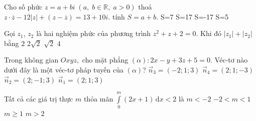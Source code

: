 \begin{ex}%
	Cho số phức $z=a+bi\; (a,\; b\in\mathbb{R},\; a>0)$ thoả $z\cdot \overline{z}-12|z|+(z-\overline{z})=13+10i$. tính $S=a+b$.
	\choice
	{S=7}
	{\True S=17}
	{S=-17}
	{S=5}
\end{ex}

\begin{ex}%
Gọi $z_1$, $z_2$ là hai nghiệm phức của phương trình $z^2+z+2=0$. Khi đó $\left| z_1\right|+\left| z_2\right|$ bằng
\choice
{$2$}
{\True $2\sqrt{2}$}
{$\sqrt{2}$}
{$4$}
\end{ex}

\begin{ex}%
Trong không gian $Oxyz,$ cho mặt phẳng $(\alpha)\colon 2x-y+3z+5=0$. Véc-tơ nào dưới đây là một véc-tơ pháp tuyến của $(\alpha)$?
\choice
{$\vec{n}_3=(-2;1;3)$}
{$\vec{n}_4=(2;1;-3)$}
{\True $\vec{n}_2=(2;-1;3)$}
{$\vec{n}_1=(2;1;3)$}
\end{ex}

\begin{ex}%
Tất cả các giá trị thực $m$ thỏa mãn $\displaystyle\int\limits_0^m{(2x+1)\mathrm{\,d}x<2}$ là
\choice
{$m<-2$}
{\True $-2<m<1$}
{$m\ge 1$}
{$m>2$}
\end{ex}

